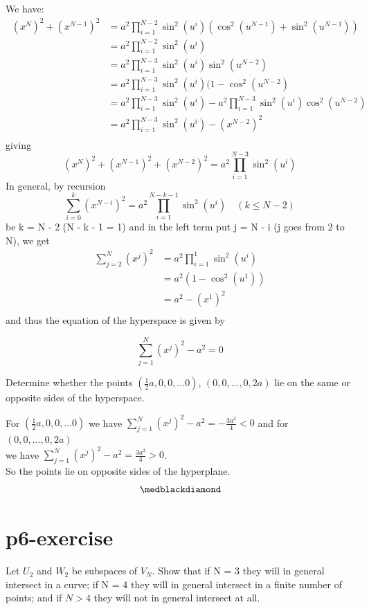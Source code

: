 We have:
\begin{align*}
\ (x^N)^2 + (x^{N-1})^2 &= a^2\prod_{i=1}^{N-2}\sin^2(u^i)(\cos^2(u^{N-1})+\sin^2(u^{N-1}))  \\
\ &= a^2\prod_{i=1}^{N-2}\sin^2(u^i)\\
\ &= a^2\prod_{i=1}^{N-3}\sin^2(u^i)\sin^2(u^{N-2})\\
\ &= a^2\prod_{i=1}^{N-3}\sin^2(u^i)(1-\cos^2(u^{N-2})\\
\ &= a^2\prod_{i=1}^{N-3}\sin^2(u^i) - a^2\prod_{i=1}^{N-3}\sin^2(u^i)\cos^2(u^{N-2})\\
\ &= a^2\prod_{i=1}^{N-3}\sin^2(u^i) - (x^{N-2})^2\\
\end{align*}
giving
$$(x^N)^2 + (x^{N-1})^2 + (x^{N-2})^2 = a^2\prod_{i=1}^{N-3}\sin^2(u^i)$$
In general, by recursion
$$\sum_{i=0}^k(x^{N-i})^2 = a^2\prod_{i=1}^{N-k-1}\sin^2(u^i)     \quad (k \leq N-2)$$
be k = N - 2 (N - k - 1 = 1) and in the left term put j = N - i (j goes from 2 to N), we get
\begin{align*}
\sum_{j=2}^N(x^{j})^2 &= a^2\prod_{i=1}^{1}\sin^2(u^i)\\
\ &= a^2(1-\cos^2(u^1))\\
\ &= a^2 - (x^1)^2\\
\end{align*}
and thus the equation of the hyperspace is given by
\begin{LARGE}
\textbf{
$$\sum_{j=1}^N(x^{j})^2 - a^2 = 0$$
}
\end{LARGE}
\begin{tcolorbox}

Determine whether the points $(\frac{1}{2}a,0,0,... 0)$, $(0,0,...,0, 2a)$ lie on the same or opposite sides of the hyperspace.
\end{tcolorbox}
For $(\frac{1}{2}a,0,0,... 0)$ we have $\sum_{j=1}^N(x^{j})^2 - a^2 = -\frac{3a^2}{4} < 0$ and for 
$(0,0,...,0, 2a)$ \\we have $\sum_{j=1}^N(x^{j})^2 - a^2 = \frac{3a^2}{4} > 0$.\\
So the points lie on opposite sides of the hyperplane.
$$\medblackdiamond$$
\pagebreak[4]

\section{p6-exercise}

\begin{tcolorbox}

Let $U_2$ and $W_2$ be subspaces of $V_N$. Show that if N = 3  they will in general intersect in a curve; if N = 4 they will in general intersect in a finite number of points; and if $N > 4$ they will not in general intersect at all.
\end{tcolorbox}

